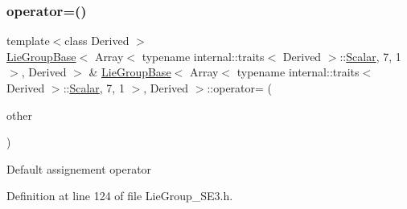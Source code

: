 \subsubsection{\texorpdfstring{operator=()}{operator=()}\hspace{0.1cm}{\footnotesize\ttfamily [1/5]}}
{\footnotesize\ttfamily template$<$class Derived $>$ \\
\hyperlink{class_lie_group_base}{Lie\+Group\+Base}$<$ Array$<$ typename internal\+::traits$<$ Derived $>$\+::\hyperlink{class_lie_group_base_3_01_array_3_01typename_01internal_1_1traits_3_01_derived_01_4_1_1_scalar_0d6d4b5459662fc32c7117aee50362fb1_a831695c575380c9a1df32eff9fc4a8c6}{Scalar}, 7, 1 $>$, Derived $>$ \& \hyperlink{class_lie_group_base}{Lie\+Group\+Base}$<$ Array$<$ typename internal\+::traits$<$ Derived $>$\+::\hyperlink{class_lie_group_base_3_01_array_3_01typename_01internal_1_1traits_3_01_derived_01_4_1_1_scalar_0d6d4b5459662fc32c7117aee50362fb1_a831695c575380c9a1df32eff9fc4a8c6}{Scalar}, 7, 1 $>$, Derived $>$\+::operator= (\begin{DoxyParamCaption}\item[{const \hyperlink{class_lie_group_base}{Lie\+Group\+Base}$<$ Array$<$ typename internal\+::traits$<$ Derived $>$\+::\hyperlink{class_lie_group_base_3_01_array_3_01typename_01internal_1_1traits_3_01_derived_01_4_1_1_scalar_0d6d4b5459662fc32c7117aee50362fb1_a831695c575380c9a1df32eff9fc4a8c6}{Scalar}, 7, 1 $>$, Derived $>$ \&}]{other }\end{DoxyParamCaption})\hspace{0.3cm}{\ttfamily [inline]}}

Default assignement operator 

Definition at line 124 of file Lie\+Group\+\_\+\+S\+E3.\+h.

\hypertarget{class_lie_group_base_3_01_array_3_01typename_01internal_1_1traits_3_01_derived_01_4_1_1_scalar_0d6d4b5459662fc32c7117aee50362fb1_a693084dd5df8a0d00793be750608fb36}{}\label{class_lie_group_base_3_01_array_3_01typename_01internal_1_1traits_3_01_derived_01_4_1_1_scalar_0d6d4b5459662fc32c7117aee50362fb1_a693084dd5df8a0d00793be750608fb36} 
